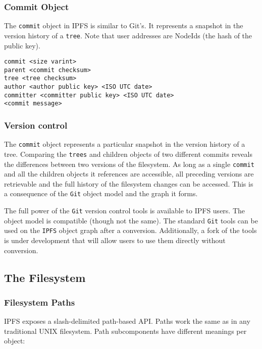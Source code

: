 \documentclass{sig-alternate}
\begin{document}
\subsubsection{Commit Object}

The \texttt{commit} object in IPFS is similar to Git's. It represents a
snapshot in the version history of a \texttt{tree}. Note that user
addresses are NodeIds (the hash of the public key).

\begin{verbatim}
commit <size varint>
parent <commit checksum>
tree <tree checksum>
author <author public key> <ISO UTC date>
committer <committer public key> <ISO UTC date>
<commit message>
\end{verbatim}

\subsubsection{Version control}

The \texttt{commit} object represents a particular snapshot in the version
history of a tree. Comparing the \texttt{trees} and children objects of two
different commits reveals the differences between two versions of the
filesystem. As long as a single \texttt{commit} and all the children objects
it references are accessible, all preceding versions are retrievable and the
full history of the filesystem changes can be accessed. This is a consequence
of the \texttt{Git} object model and the graph it forms.

The full power of the \texttt{Git} version control tools is available to IPFS
users. The object model is compatible (though not the same). The standard
\texttt{Git} tools can be used on the \texttt{IPFS} object graph after a
conversion. Additionally, a fork of the tools is under development that will
allow users to use them directly without conversion.


\subsection{The Filesystem}

\subsubsection{Filesystem Paths}

IPFS exposes a slash-delimited path-based API. Paths work the same as in any
traditional UNIX filesystem. Path subcomponents have different meanings per
object:
\end{document}
